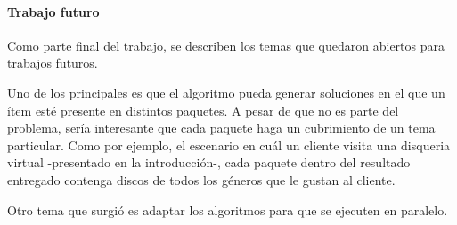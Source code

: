 \paragraph{Trabajo futuro} Como parte final del trabajo, se describen los temas que quedaron abiertos para trabajos futuros. 

Uno de los principales es que el algoritmo pueda generar soluciones en el que un ítem esté presente en distintos paquetes. A pesar de que no es parte del problema, sería interesante que cada paquete haga un cubrimiento de un tema particular. Como por ejemplo, el escenario en cuál un cliente visita una disqueria virtual -presentado en la introducción-, cada paquete dentro del resultado entregado contenga discos de todos los géneros que le gustan al cliente.

Otro tema que surgió es adaptar los algoritmos para que se ejecuten en paralelo.